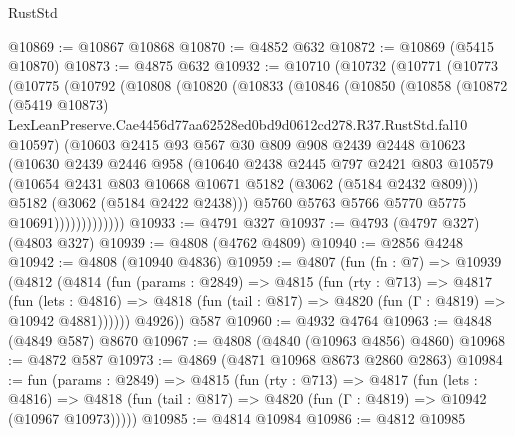 \begin{lexlean}{RustStd}
\begin{coremodule}
@10869 := @10867 @10868
@10870 := @4852 @632
@10872 := @10869 (@5415 @10870)
@10873 := @4875 @632
@10932 := @10710
    (@10732
      (@10771
        (@10773
          (@10775
            (@10792
              (@10808
                (@10820
                  (@10833
                    (@10846
                      (@10850
                        (@10858
                          (@10872
                            (@5419 @10873)
                            LexLeanPreserve.Cae4456d77aa62528ed0bd9d0612cd278.R37.RustStd.fal10
                            @10597)
                          (@10603
                            @2415
                            @93
                            @567
                            @30
                            @809
                            @908
                            @2439
                            @2448
                            @10623
                            (@10630
                              @2439
                              @2446
                              @958
                              (@10640
                                @2438
                                @2445
                                @797
                                @2421
                                @803
                                @10579
                                (@10654 @2431 @803 @10668 @10671 @5182 (@3062 (@5184 @2432 @809)))
                                @5182
                                (@3062 (@5184 @2422 @2438)))
                              @5760
                              @5763
                              @5766
                              @5770
                              @5775
                              @10691)))))))))))))
@10933 := @4791 @327
@10937 := @4793 (@4797 @327) (@4803 @327)
@10939 := @4808 (@4762 @4809)
@10940 := @2856 @4248
@10942 := @4808 (@10940 @4836)
@10959 := @4807
    (fun (fn : @7) =>
    @10939
      (@4812
        (@4814
          (fun (params : @2849) =>
          @4815
            (fun (rty : @713) =>
            @4817
              (fun (lets : @4816) =>
              @4818 (fun (tail : @817) => @4820 (fun (Γ : @4819) => @10942 @4881))))))
        @4926))
    @587
@10960 := @4932 @4764
@10963 := @4848 (@4849 @587) @8670
@10967 := @4808 (@4840 (@10963 @4856) @4860)
@10968 := @4872 @587
@10973 := @4869 (@4871 @10968 @8673 @2860 @2863)
@10984 := fun (params : @2849) =>
  @4815
    (fun (rty : @713) =>
    @4817
      (fun (lets : @4816) =>
      @4818 (fun (tail : @817) => @4820 (fun (Γ : @4819) => @10942 (@10967 @10973)))))
@10985 := @4814 @10984
@10986 := @4812 @10985

\end{coremodule}
\end{lexlean}
